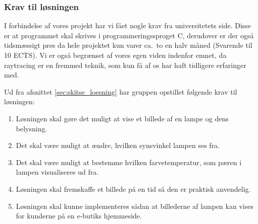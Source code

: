 \subsubsection{Krav til løsningen}
\label{sec:krav}

I forbindelse af vores projekt har vi fået nogle krav fra universitetets side. Disse er at programmet skal skrives i programmeringssproget C, derudover er der også tidsmæssigt pres da hele projektet kun varer ca.\ to en halv måned (Svarende til 10 ECTS). 
Vi er også begrænset af vores egen viden indenfor emnet, da raytracing er en fremmed teknik, som kun få af os har haft tidligere erfaringer med. 

Ud fra afsnittet \ref{sec:skitse_loesning} har gruppen opstillet følgende krav til løsningen:
\begin{enumerate}
    \item Løsningen skal gøre det muligt at vise et billede af en lampe og dens belysning.
    \item Det skal være muligt at ændre, hvilken synsvinkel lampen ses fra.
    \item Det skal være muligt at bestemme hvilken farvetemperatur, som pæren i lampen visualiseres ud fra.
    \item Løsningen skal fremskaffe et billede på en tid så den er praktisk anvendelig.
    \item Løsningen skal kunne implementeres sådan at billederne af lampen kan vises for kunderne på en e-butiks hjemmeside.
\end{enumerate}